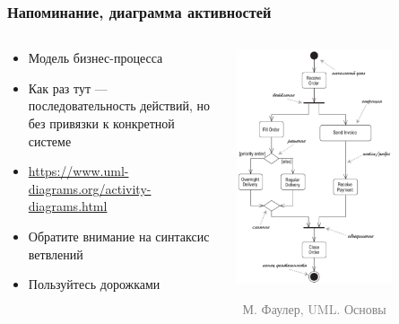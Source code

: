 \documentclass[xetex,mathserif,serif]{beamer}
\newcommand{\attribution}[1] {
    \vspace{-5mm}\begin{flushright}\begin{scriptsize}\textcolor{gray}{\textcopyright\, #1}\end{scriptsize}\end{flushright}
}
\begin{document}
    \begin{frame}
        \frametitle{Напоминание, диаграмма активностей}
        \begin{columns}
            \begin{column}{0.5\textwidth}
                \begin{itemize}
                    \item Модель бизнес-процесса
                    \item Как раз тут --- последовательность действий, но без привязки к конкретной системе
                    \item \url{https://www.uml-diagrams.org/activity-diagrams.html}
                    \item Обратите внимание на синтаксис ветвлений
                    \item Пользуйтесь дорожками
                \end{itemize}
            \end{column}
            \begin{column}{0.5\textwidth}
                \begin{center}
                    \includegraphics[width=0.7\textwidth]{activityDiagram.png}
                    \attribution{М. Фаулер, UML. Основы}
                \end{center}
            \end{column}
        \end{columns}
    \end{frame}
\end{document}

